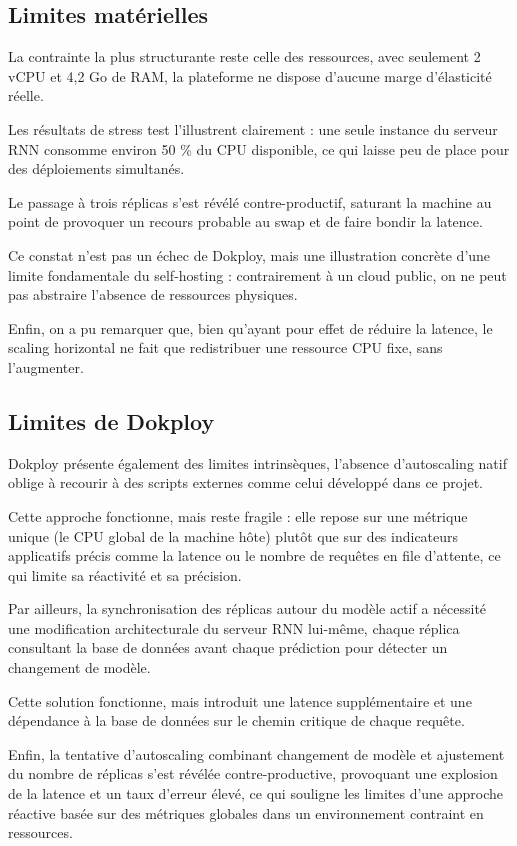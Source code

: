\documentclass{rapportClass} %
\begin{document}
\subsection{Limites matérielles}
La contrainte la plus structurante reste celle des ressources, avec seulement 2 vCPU et 4,2 Go de RAM, 
la plateforme ne dispose d'aucune marge d'élasticité réelle. 

\smallskip
Les résultats de stress test l'illustrent clairement : une seule instance du serveur RNN consomme 
environ 50 \% du CPU disponible, ce qui laisse peu de place pour des déploiements simultanés. 

\smallskip
Le passage à trois réplicas s'est révélé contre-productif, saturant la machine au point de provoquer un recours 
probable au swap et de faire bondir la latence.

\smallskip
Ce constat n'est pas un échec de Dokploy, mais une illustration concrète d'une limite fondamentale du self-hosting : 
contrairement à un cloud public, on ne peut pas abstraire l'absence de ressources physiques. 

Enfin, on a pu remarquer que, bien qu'ayant pour effet de réduire la latence, le scaling horizontal ne fait que 
redistribuer une ressource CPU fixe, sans l'augmenter.

\subsection{Limites de Dokploy}
Dokploy présente également des limites intrinsèques, l'absence d'autoscaling natif oblige à recourir à des 
scripts externes comme celui développé dans ce projet. 

\smallskip
Cette approche fonctionne, mais reste fragile : elle repose sur une métrique unique (le CPU global de la machine hôte) 
plutôt que sur des indicateurs applicatifs précis comme la latence ou le nombre de requêtes en file d'attente, 
ce qui limite sa réactivité et sa précision.

Par ailleurs, la synchronisation des réplicas autour du modèle actif a nécessité une modification architecturale du 
serveur RNN lui-même, chaque réplica consultant la base de données avant chaque prédiction pour détecter un changement 
de modèle. 

\smallskip
Cette solution fonctionne, mais introduit une latence supplémentaire et 
une dépendance à la base de données sur le chemin critique de chaque requête.

Enfin, la tentative d'autoscaling combinant changement de modèle et ajustement du nombre de réplicas s'est révélée contre-productive,
provoquant une explosion de la latence et un taux d'erreur élevé, ce qui souligne les limites d'une approche réactive 
basée sur des métriques globales dans un environnement contraint en ressources.
\end{document}
